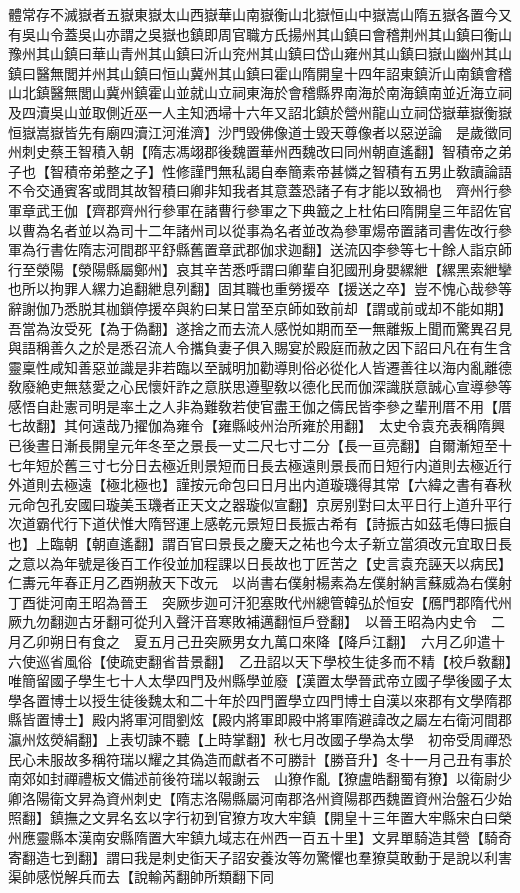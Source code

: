 體常存不滅嶽者五嶽東嶽太山西嶽華山南嶽衡山北嶽恒山中嶽嵩山隋五嶽各置今又有吳山令蓋吳山亦謂之吳嶽也鎮即周官職方氏揚州其山鎮曰會稽荆州其山鎮曰衡山豫州其山鎮曰華山青州其山鎮曰沂山兖州其山鎮曰岱山雍州其山鎮曰嶽山幽州其山鎮曰醫無閭并州其山鎮曰恒山冀州其山鎮曰霍山隋開皇十四年詔東鎮沂山南鎮會稽山北鎮醫無閭山冀州鎮霍山並就山立祠東海於會稽縣界南海於南海鎮南並近海立祠及四瀆吳山並取側近巫一人主知洒埽十六年又詔北鎮於營州龍山立祠岱嶽華嶽衡嶽恒嶽嵩嶽皆先有廟四瀆江河淮濟】沙門毁佛像道士毁天尊像者以惡逆論　是歲徵同州刺史蔡王智積入朝【隋志馮翊郡後魏置華州西魏改曰同州朝直遙翻】智積帝之弟子也【智積帝弟整之子】性修謹門無私謁自奉簡素帝甚憐之智積有五男止敎讀論語不令交通賓客或問其故智積曰卿非知我者其意蓋恐諸子有才能以致禍也　齊州行參軍章武王伽【齊郡齊州行參軍在諸曹行參軍之下典籖之上杜佑曰隋開皇三年詔佐官以曹為名者並以為司十二年諸州司以從事為名者並改為參軍煬帝置諸司書佐改行參軍為行書佐隋志河間郡平舒縣舊置章武郡伽求迦翻】送流囚李參等七十餘人詣京師行至滎陽【滎陽縣屬鄭州】哀其辛苦悉呼謂曰卿輩自犯國刑身嬰縲紲【縲黑索紲攣也所以拘罪人縲力追翻紲息列翻】固其職也重勞援卒【援送之卒】豈不愧心哉參等辭謝伽乃悉脱其枷鎖停援卒與約曰某日當至京師如致前却【謂或前或却不能如期】吾當為汝受死【為于偽翻】遂捨之而去流人感悦如期而至一無離叛上聞而驚異召見與語稱善久之於是悉召流人令攜負妻子俱入賜宴於殿庭而赦之因下詔曰凡在有生含靈稟性咸知善惡並識是非若臨以至誠明加勸導則俗必從化人皆遷善往以海内亂離德敎廢絶吏無慈愛之心民懷奸詐之意朕思遵聖敎以德化民而伽深識朕意誠心宣導參等感悟自赴憲司明是率土之人非為難敎若使官盡王伽之儔民皆李參之輩刑厝不用【厝七故翻】其何遠哉乃擢伽為雍令【雍縣岐州治所雍於用翻】　太史令袁充表稱隋興已後晝日漸長開皇元年冬至之景長一丈二尺七寸二分【長一亘亮翻】自爾漸短至十七年短於舊三寸七分日去極近則景短而日長去極遠則景長而日短行内道則去極近行外道則去極遠【極北極也】謹按元命包曰日月出内道璇璣得其常【六緯之書有春秋元命包孔安國曰璇美玉璣者正天文之器璇似宣翻】京房别對曰太平日行上道升平行次道霸代行下道伏惟大隋唘運上感乾元景短日長振古希有【詩振古如茲毛傳曰振自也】上臨朝【朝直遙翻】謂百官曰景長之慶天之祐也今太子新立當須改元宜取日長之意以為年號是後百工作役並加程課以日長故也丁匠苦之【史言袁充誣天以病民】仁夀元年春正月乙酉朔赦天下改元　以尚書右僕射楊素為左僕射納言蘇威為右僕射　丁酉徙河南王昭為晉王　突厥步迦可汗犯塞敗代州總管韓弘於恒安【鴈門郡隋代州厥九勿翻迦古牙翻可從刋入聲汗音寒敗補邁翻恒戶登翻】　以晉王昭為内史令　二月乙卯朔日有食之　夏五月己丑突厥男女九萬口來降【降戶江翻】　六月乙卯遣十六使巡省風俗【使疏吏翻省昔景翻】　乙丑詔以天下學校生徒多而不精【校戶敎翻】唯簡留國子學生七十人太學四門及州縣學並廢【漢置太學晉武帝立國子學後國子太學各置博士以授生徒後魏太和二十年於四門置學立四門博士自漢以來郡有文學隋郡縣皆置博士】殿内將軍河間劉炫【殿内將軍即殿中將軍隋避諱改之屬左右衛河間郡瀛州炫熒絹翻】上表切諫不聽【上時掌翻】秋七月改國子學為太學　初帝受周禪恐民心未服故多稱符瑞以耀之其偽造而獻者不可勝計【勝音升】冬十一月己丑有事於南郊如封禪禮板文備述前後符瑞以報謝云　山獠作亂【獠盧皓翻蜀有獠】以衛尉少卿洛陽衛文昇為資州刺史【隋志洛陽縣屬河南郡洛州資陽郡西魏置資州治盤石少始照翻】鎮撫之文昇名玄以字行初到官獠方攻大牢鎮【開皇十三年置大牢縣宋白曰榮州應靈縣本漢南安縣隋置大牢鎮九域志在州西一百五十里】文昇單騎造其營【騎奇寄翻造七到翻】謂曰我是刺史衘天子詔安養汝等勿驚懼也羣獠莫敢動于是說以利害渠帥感悦解兵而去【說輸芮翻帥所類翻下同
